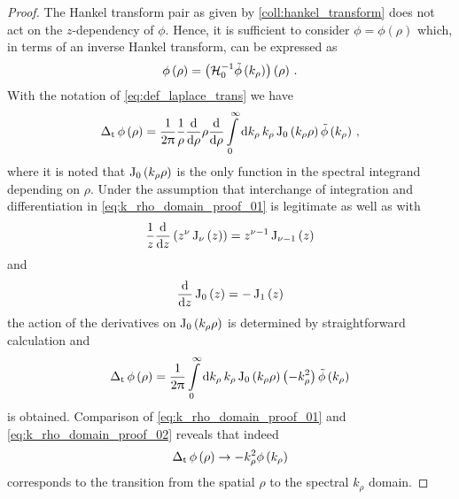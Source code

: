 \begin{proof}
	The Hankel transform pair as given by \cref{coll:hankel_transform} does not
	act on the $z$-dependency of $\phi$.
	Hence, it is sufficient to consider
	$\phi = \phi \left(\rho\right)$ which, in terms of an inverse Hankel
	transform, can be expressed as
	\begin{equation}
		\phi \left(\rho\right) =
		\left(\mathcal{H}^{-1}_{0} \tilde{\phi} \left(k_\rho\right)\right)
		\left(\rho\right)
		\, .
	\end{equation}
	With the notation of \eqref{eq:def_laplace_trans} we have
	\begin{equation}\label{eq:k_rho_domain_proof_01}
		\operatorname{\operatorname{\Delta}_\mathrm{t}}
		\phi \left(\rho\right) =
		\frac{1}{2\uppi}
		\frac{1}{\rho}
		\frac{\mathrm{d}}{\mathrm{d} \rho}
		\rho
		\frac{\mathrm{d}}{\mathrm{d} \rho}
		\int\limits_{0}^{\infty} \mathrm{d} k_\rho \, k_\rho
		\operatorname{J}_{0}\left(k_\rho \rho\right)
		\tilde{\phi} \left(k_\rho\right)
		\, ,
	\end{equation}
	where it is noted that $\operatorname{J}_{0}\left(k_\rho \rho\right)$ is the only
	function in the spectral integrand depending on $\rho$.
	Under the assumption that interchange of integration and differentiation in 
	\eqref{eq:k_rho_domain_proof_01} is legitimate as well as with
	\cite[(10.6.6)]{Olver2010}
	\begin{equation}
		\frac{1}{z}
		\frac{\mathrm{d}}{\mathrm{d} z}
		\left( z^\nu \operatorname{J}_{\nu} \left(z\right) \right) =
		z^{\nu - 1} \operatorname{J}_{\nu - 1} \left(z\right)
	\end{equation}
	and \cite[(10.4.1)]{Olver2010}
	\begin{equation}
		\frac{\mathrm{d}}{\mathrm{d} z} \operatorname{J}_{0} \left(z\right) = 
		-\operatorname{J}_{1} \left(z\right)
	\end{equation}
	the action of the derivatives on $\operatorname{J}_{0}\left(k_\rho \rho\right)$ 
	is determined by straightforward calculation and
	\begin{equation}\label{eq:k_rho_domain_proof_02}
		\operatorname{\operatorname{\Delta}_\mathrm{t}}
		\phi \left(\rho\right) =
		\frac{1}{2\uppi}
		\int\limits_{0}^{\infty} \mathrm{d} k_\rho \, k_\rho
		\operatorname{J}_{0}\left(k_\rho \rho\right)
		\left( -k_\rho^2 \right)
		\tilde{\phi} \left(k_\rho\right) 
	\end{equation}
	is obtained.
	Comparison of \eqref{eq:k_rho_domain_proof_01} and
	\eqref{eq:k_rho_domain_proof_02} reveals that indeed
	\begin{equation}
		\operatorname{\operatorname{\Delta}_\mathrm{t}}
		\phi \left(\rho\right)
		\to
		-k_\rho^2 
		\phi \left(k_\rho\right)
	\end{equation}
	corresponds to the transition from the spatial $\rho$ to the spectral
	$k_\rho$ domain.
\end{proof}
